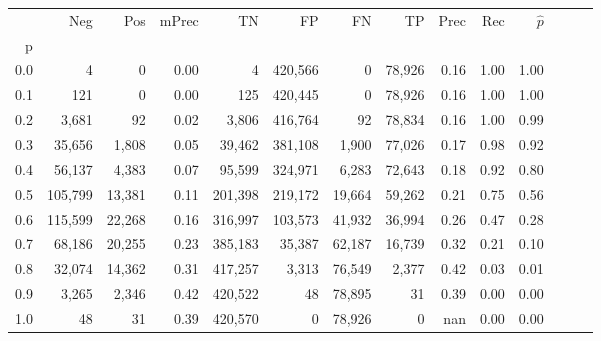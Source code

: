 \begin{tabular}{rrrrrrrrrrrrrr}
\toprule
{} &      Neg &     Pos & mPrec &       TN &       FP &      FN &      TP &  Prec &   Rec & $\hat{p}$ \\
p   &          &         &       &          &          &         &         &       &       &           \\
\midrule
0.0 &        4 &       0 &  0.00 &        4 &  420,566 &       0 &  78,926 &  0.16 &  1.00 &      1.00 \\
0.1 &      121 &       0 &  0.00 &      125 &  420,445 &       0 &  78,926 &  0.16 &  1.00 &      1.00 \\
0.2 &    3,681 &      92 &  0.02 &    3,806 &  416,764 &      92 &  78,834 &  0.16 &  1.00 &      0.99 \\
0.3 &   35,656 &   1,808 &  0.05 &   39,462 &  381,108 &   1,900 &  77,026 &  0.17 &  0.98 &      0.92 \\
0.4 &   56,137 &   4,383 &  0.07 &   95,599 &  324,971 &   6,283 &  72,643 &  0.18 &  0.92 &      0.80 \\
0.5 &  105,799 &  13,381 &  0.11 &  201,398 &  219,172 &  19,664 &  59,262 &  0.21 &  0.75 &      0.56 \\
0.6 &  115,599 &  22,268 &  0.16 &  316,997 &  103,573 &  41,932 &  36,994 &  0.26 &  0.47 &      0.28 \\
0.7 &   68,186 &  20,255 &  0.23 &  385,183 &   35,387 &  62,187 &  16,739 &  0.32 &  0.21 &      0.10 \\
0.8 &   32,074 &  14,362 &  0.31 &  417,257 &    3,313 &  76,549 &   2,377 &  0.42 &  0.03 &      0.01 \\
0.9 &    3,265 &   2,346 &  0.42 &  420,522 &       48 &  78,895 &      31 &  0.39 &  0.00 &      0.00 \\
1.0 &       48 &      31 &  0.39 &  420,570 &        0 &  78,926 &       0 &   nan &  0.00 &      0.00 \\
\bottomrule
\end{tabular}
